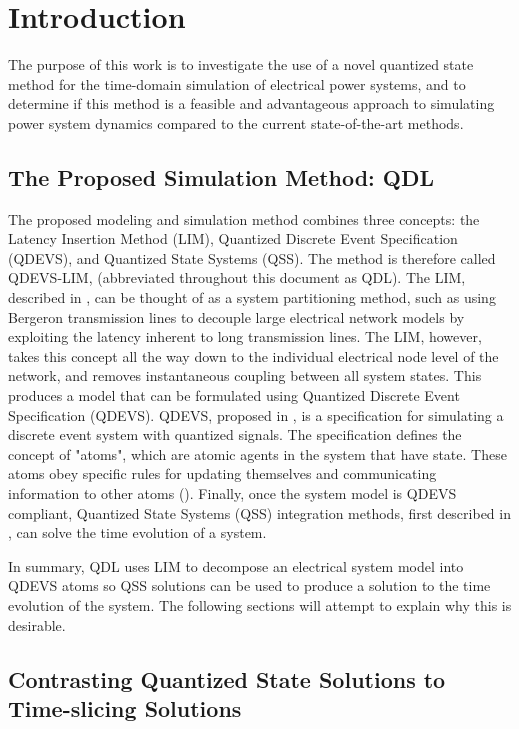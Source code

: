 
\chapter{Introduction}\label{chap:introduction}

The purpose of this work is to investigate the use of a novel quantized state method for the time-domain simulation of electrical power systems, and to determine if this method is a feasible and advantageous approach to simulating power system dynamics compared to the current state-of-the-art methods. 

\section{The Proposed Simulation Method: QDL}

The proposed modeling and simulation method combines three concepts: the Latency Insertion Method (LIM), Quantized Discrete Event Specification (QDEVS), and Quantized State Systems (QSS). The method is therefore called QDEVS-LIM, (abbreviated throughout this document as QDL). The LIM, described in \cite{schutt2001}, can be thought of as a system partitioning method, such as using Bergeron transmission lines to decouple large electrical network models by exploiting the latency inherent to long transmission lines. The LIM, however, takes this concept all the way down to the individual electrical node level of the network, and removes instantaneous coupling between all system states. This produces a model that can be formulated using Quantized Discrete Event Specification (QDEVS). QDEVS, proposed in \cite{zeigler1999}, is a specification for simulating a discrete event system with quantized signals. The specification defines the concept of "atoms", which are atomic agents in the system that have state. These atoms obey specific rules for updating themselves and communicating information to other atoms (\cite{zeigler1999}). Finally, once the system model is QDEVS compliant, Quantized State Systems (QSS) integration methods, first described in \cite{cellier2008}, can solve the time evolution of a system.

In summary, QDL uses LIM to decompose an electrical system model into QDEVS atoms so QSS solutions can be used to produce a solution to the time evolution of the system. The following sections will attempt to explain why this is desirable.

\section{Contrasting Quantized State Solutions to Time-slicing Solutions}

